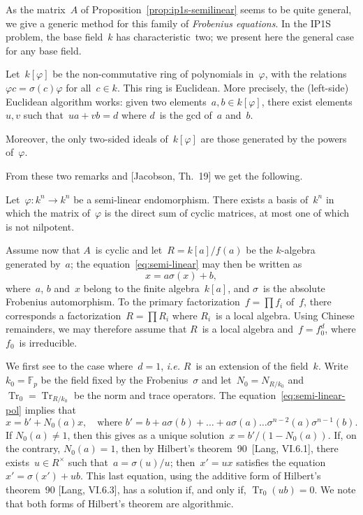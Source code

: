 \documentclass{article}%
\DeclareMathOperator\Tr{Tr}
\def\F{\mathbb{F}}
\begin{document}
As the matrix~$A$ of Proposition~\ref{prop:ip1s-semilinear} seems to be
quite general, we give a generic method for this family of
\emph{Frobenius equations}.
In the IP1S problem, the base field~$k$ has characteristic~two; we
present here the general case for any base field.

Let~$k[φ]$ be the non-commutative ring of polynomials in~$φ$, with the
relations~$φ c = σ(c) φ$ for all~$c ∈ k$. This ring is Euclidean.
More precisely, the (left-side) Euclidean algorithm works: given two
elements~$a, b ∈ k[φ]$, there exist elements~$u, v$ such that~$u a + v b =
d$ where $d$~is the gcd of~$a$ and~$b$.

Moreover, the only two-sided ideals of~$k[φ]$ are those generated by the
powers of~$φ$.

From these two remarks and [Jacobson, Th.~19] we get the following.
\begin{thm}
Let~$φ: k^n → k^n$ be a semi-linear endomorphism. There exists a basis
of~$k^n$ in which the matrix of~$φ$ is the direct sum of cyclic matrices,
at most one of which is not nilpotent.
\end{thm}

Assume now that $A$~is cyclic and let~$R = k[a]/f(a)$ be the $k$-algebra
generated by~$a$; the equation~\eqref{eq:semi-linear} may then be written
as
\begin{equation}\label{eq:semi-linear-pol}
x = a σ(x) + b,
\end{equation}
where~$a$, $b$ and~$x$ belong to the finite algebra~$k[a]$, and $σ$~is
the absolute Frobenius automorphism. To the primary factorization~$f = ∏
f_i$ of~$f$, there corresponds a factorization~$R = ∏ R_i$ where $R_i$~is
a local algebra. Using Chinese remainders, we may therefore assume that
$R$~is a local algebra and~$f = f_0^d$, where $f_0$~is irreducible.

We first see to the case where~$d = 1$, \emph{i.e.} $R$~is an extension
of the field~$k$. Write~$k_0 = \F_p$ be the field fixed by the
Frobenius~$σ$ and let~$N_0 = N_{R/k_0}$ and~$\Tr_0 = \Tr_{R/k_0}$ be the
norm and trace operators. The equation~\eqref{eq:semi-linear-pol} implies
that
\begin{equation}
x = b' + N_0(a) x, \quad\text{where $b' = b + a σ(b) + … + a σ(a) …
σ^{n-2}(a) σ^{n-1}(b)$.}
\end{equation}
If $N_0(a) ≠ 1$, then this gives as a unique solution~$x =
b'/(1-N_0(a))$. If, on the contrary, $N_0(a) = 1$, then by
Hilbert's theorem~90~[Lang, VI.6.1], there exists~$u ∈ R^{×}$ such
that~$a = σ(u)/u$; then~$x' = ux$ satisfies the equation~$x' = σ(x') +
ub$. This last equation, using the additive form of Hilbert's theorem~90
[Lang, VI.6.3], has a solution if, and only if, $\Tr_0 (ub) = 0$. We
note that both forms of Hilbert's theorem are algorithmic.
\end{document}
